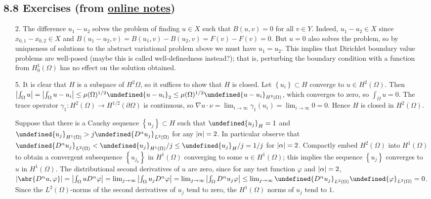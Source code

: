 \documentclass[11pt,leqno]{article}
\theoremstyle{plain}
\theoremstyle{definition}
\numberwithin{equation}{section}
\numberwithin{lem}{section}
\newcommand{\cbr}[1]{\left\{#1\right\}}
\let\norm\undefined %
\DeclarePairedDelimiter\norm{\lVert}{\rVert}
\begin{document}
\subsection*{8.8 Exercises (from \href{https://users.oden.utexas.edu/~arbogast/appMath08c.pdf}{online notes})}
\begin{enumerate}
    \item[2.] The difference $u_1-u_2$ solves the problem of finding $u\in X$ such that $B(u,v) = 0$ for all $v\in Y$. Indeed, $u_1-u_2\in X$ since $x_{0,1} - x_{0,2}\in X$ and $B(u_1-u_2,v) = B(u_1,v) - B(u_2,v) = F(v) - F(v) = 0$. But $u=0$ also solves the problem, so by uniqueness of solutions to the abstract variational problem above we must have $u_1 = u_2$. This implies that Dirichlet boundary value problems are well-posed (maybe this is called well-definedness instead?); that is, perturbing the boundary condition with a function from $H^1_0(\Omega)$ has no effect on the solution obtained.
    \item[5.] It is clear that $H$ is a subspace of $H^2{\Omega}$, so it suffices to show that $H$ is closed. Let $\cbr{u_i}\subset H$ converge to $u\in H^2(\Omega)$. Then $\abs{\int_\Omega u} = \abs{\int_\Omega u-u_i}\leq \mu(\Omega)^{1/2}\norm{u-u_i}_2\leq \mu(\Omega)^{1/2}\norm{u-u_i}_{H^2(\Omega)}$, which converges to zero, so $\int_\Omega u = 0$. The trace operator $\gamma_1\colon H^2(\Omega)\to H^{1/2}(\partial \Omega)$ is continuous, so $\nabla u\cdot \nu = \lim_{i\to\infty} \gamma_1(u_i) = \lim_{i\to\infty} 0 = 0$. Hence $H$ is closed in $H^2(\Omega)$.
    
    Suppose that there is a Cauchy sequence $\cbr{u_j}\subset H$ such that $\norm{u_j}_H = 1$ and $\norm{u_j}_{H^1(\Omega)}>j\norm{D^\alpha u_j}_{L^2(\Omega)}$ for any $\abs{\alpha} = 2$. In particular observe that $\norm{D^\alpha u_j}_{L^2(\Omega)}< \norm{u_j}_{H^1(\Omega)}/j\leq \norm{u_j}_H/j = 1/j$ for $\abs{\alpha} = 2$. Compactly embed $H^2(\Omega)$ into $H^1(\Omega)$ to obtain a convergent subsequence $\cbr{u_{j_k}}$ in $H^1(\Omega)$ converging to some $u\in H^1(\Omega)$; this implies the sequence $\cbr{u_j}$ converges to $u$ in $H^1(\Omega)$. The distributional second derivatives of $u$ are zero, since for any test function $\varphi$ and $\abs{\alpha} = 2$, $\abs{\abr{D^\alpha u,\varphi}} = \abs{\int_\Omega uD^\alpha \varphi} = \lim_{j\to\infty}\abs{\int_\Omega u_jD^\alpha \varphi} = \lim_{j\to\infty}\abs{\int_\Omega D^\alpha u_j\varphi}\leq \lim_{j\to\infty}\norm{D^\alpha u_j}_{L^2(\Omega)}\norm{\varphi}_{L^2(\Omega)} = 0$. Since the $L^2(\Omega)$-norms of the second derivatives of $u_j$ tend to zero, the $H^1(\Omega)$ norms of $u_j$ tend to $1$.


\end{enumerate}
\end{document}
